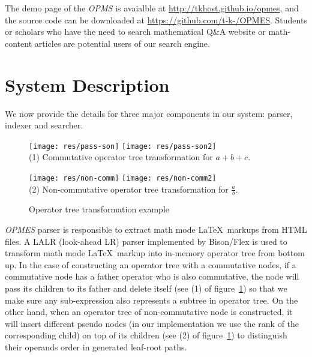 \documentclass{llncs}
\begin{document}
The demo page of the {\em OPMS} is avaialble at
\url{http://tkhost.github.io/opmes}, and the source code can be downloaded 
at \url{https://github.com/t-k-/OPMES}. Students or scholars who have the 
need to search mathematical Q\&A website or math-content articles are potential 
users of our search engine.


\section{System Description}
We now provide the details for three major components in our system: 
parser, indexer and searcher.

\begin{figure}
\begin{minipage}[b]{2.2in}
\begin{center}
{\texttt{[image: res/pass-son]}}
\hspace*{0.2in}
{\texttt{[image: res/pass-son2]}}
\\ (1) Commutative operator tree transformation for $a+b+c$. 
\end{center}
\end{minipage}
\hspace*{0.2in}
\begin{minipage}[b]{2.2in}
\begin{center}
{\texttt{[image: res/non-comm]}}
\hspace*{0.2in}
{\texttt{[image: res/non-comm2]}}
\\ (2) Non-commutative operator tree transformation for $\frac a b$. 
\end{center}
\end{minipage}
\caption{Operator tree transformation example}\label{op_tr_trans}
\end{figure}

{\em OPMES} parser is responsible to extract math mode \LaTeX\ markups from HTML files. 
A LALR (look-ahead LR) parser implemented by Bison/Flex is used to transform math mode \LaTeX\ markup into in-memory operator tree from bottom up.
In the case of constructing an operator tree with a commutative nodes, if a commutative node has a father operator who is also commutative, the node will pass its children to its father and delete itself (see (1) of figure~\ref{op_tr_trans}) so that we make sure any sub-expression also represents a subtree in operator tree.
On the other hand, when an operator tree of non-commutative node is constructed, it will insert different pseudo nodes (in our implementation we use the rank of the corresponding child) on top of its children (see (2) of figure~\ref{op_tr_trans}) to distinguish their operands order in generated leaf-root paths.
\end{document}
